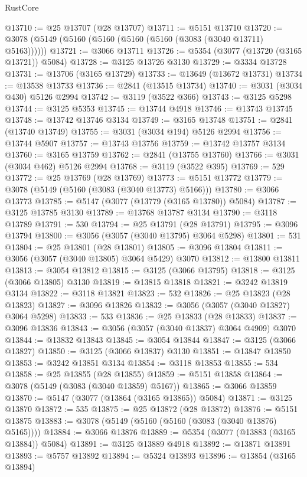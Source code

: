 \begin{lexlean}{RustCore}
\begin{coremodule}
@13710 := @25 @13707 (@28 @13707)
@13711 := @5151 @13710
@13720 := @3078 (@5149 (@5160 (@5160 (@5160 (@5160 (@3083 (@3040 @13711) @5163))))))
@13721 := @3066 @13711
@13726 := @5354 (@3077 (@13720 (@3165 @13721)) @5084)
@13728 := @3125 @13726 @3130
@13729 := @3334 @13728
@13731 := @13706 (@3165 @13729)
@13733 := @13649 (@13672 @13731)
@13734 := @13538 @13733
@13736 := @2841 (@13515 @13734)
@13740 := @3031 (@3034 @430) @5126 @2994
@13742 := @3119 (@3522 @366)
@13743 := @3125 @5298
@13744 := @3125 @5353
@13745 := @13744 @4918
@13746 := @13743 @13745
@13748 := @13742 @13746 @3134
@13749 := @3165 @13748
@13751 := @2841 (@13740 @13749)
@13755 := @3031 (@3034 @194) @5126 @2994
@13756 := @13744 @5907
@13757 := @13743 @13756
@13759 := @13742 @13757 @3134
@13760 := @3165 @13759
@13762 := @2841 (@13755 @13760)
@13766 := @3031 (@3034 @462) @5126 @2994
@13768 := @3119 (@3522 @395)
@13769 := 529
@13772 := @25 @13769 (@28 @13769)
@13773 := @5151 @13772
@13779 := @3078 (@5149 (@5160 (@3083 (@3040 @13773) @5166)))
@13780 := @3066 @13773
@13785 := @5147 (@3077 (@13779 (@3165 @13780)) @5084)
@13787 := @3125 @13785 @3130
@13789 := @13768 @13787 @3134
@13790 := @3118 @13789
@13791 := 530
@13794 := @25 @13791 (@28 @13791)
@13795 := @3096 @13794
@13800 := @3056 (@3057 (@3040 @13795) @3064 @5298)
@13801 := 531
@13804 := @25 @13801 (@28 @13801)
@13805 := @3096 @13804
@13811 := @3056 (@3057 (@3040 @13805) @3064 @5429) @3070
@13812 := @13800 @13811
@13813 := @3054 @13812
@13815 := @3125 (@3066 @13795)
@13818 := @3125 (@3066 @13805) @3130
@13819 := @13815 @13818
@13821 := @3242 @13819 @3134
@13822 := @3118 @13821
@13823 := 532
@13826 := @25 @13823 (@28 @13823)
@13827 := @3096 @13826
@13832 := @3056 (@3057 (@3040 @13827) @3064 @5298)
@13833 := 533
@13836 := @25 @13833 (@28 @13833)
@13837 := @3096 @13836
@13843 := @3056 (@3057 (@3040 @13837) @3064 @4909) @3070
@13844 := @13832 @13843
@13845 := @3054 @13844
@13847 := @3125 (@3066 @13827)
@13850 := @3125 (@3066 @13837) @3130
@13851 := @13847 @13850
@13853 := @3242 @13851 @3134
@13854 := @3118 @13853
@13855 := 534
@13858 := @25 @13855 (@28 @13855)
@13859 := @5151 @13858
@13864 := @3078 (@5149 (@3083 (@3040 @13859) @5167))
@13865 := @3066 @13859
@13870 := @5147 (@3077 (@13864 (@3165 @13865)) @5084)
@13871 := @3125 @13870
@13872 := 535
@13875 := @25 @13872 (@28 @13872)
@13876 := @5151 @13875
@13883 := @3078 (@5149 (@5160 (@5160 (@3083 (@3040 @13876) @5165))))
@13884 := @3066 @13876
@13889 := @5354 (@3077 (@13883 (@3165 @13884)) @5084)
@13891 := @3125 @13889 @4918
@13892 := @13871 @13891
@13893 := @5757 @13892
@13894 := @5324 @13893
@13896 := @13854 (@3165 @13894)

\end{coremodule}
\end{lexlean}
